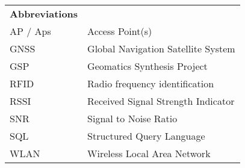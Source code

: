 \begin{table}[H]
\label{my-label}
\begin{tabular}{ll}
\textbf{Abbreviations} &                                    \\
AP / Aps               & Access Point(s)                    \\
GNSS                   & Global Navigation Satellite System \\
GSP                    & Geomatics Synthesis Project        \\
RFID                   & Radio frequency identification     \\
RSSI                   & Received Signal Strength Indicator \\
SNR                    & Signal to Noise Ratio              \\
SQL                    & Structured Query Language          \\
WLAN                   & Wireless Local Area Network        \\
\end{tabular}
\end{table}
